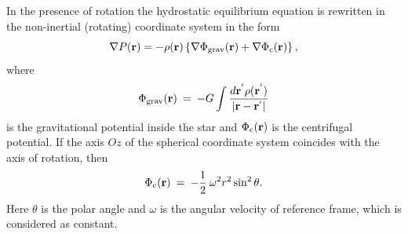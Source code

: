 \documentclass{caosp308}
\begin{document}
In the presence of rotation the hydrostatic equilibrium equation is rewritten in the non-inertial (rotating) coordinate system in the form \citep{1933MNRAS..93..390C}
\begin{equation}
\label{eq_002da}
\nabla P({\bf r})=-\rho({\bf r})\left\{\nabla\Phi_{\rm grav}({\bf r})+\nabla\Phi_{\rm c}({\bf r})\right\},
\end{equation}
where
\begin{equation}
\label{eq_003da}
\Phi_{\rm grav}({\bf r})\:=\:-G\int\frac{d{\bf r}^{'}\rho({\bf r}^{'})}{|{\bf r}-{\bf r}^{'}|}
\end{equation}
is the gravitational potential inside the star and $\Phi_{\rm c}({\bf r})$ is the centrifugal potential. If the axis $Oz$ of the spherical coordinate system coincides with the axis of rotation, then
\begin{equation}
\label{eq_004da}
\Phi_{\rm c}({\bf r})\:=\:-\frac12\:\omega^2 r^2\sin^2\theta.
\end{equation}
Here $\theta$ is the polar angle and $\omega$ is the angular velocity of reference frame, which is considered as constant.
\end{document}
